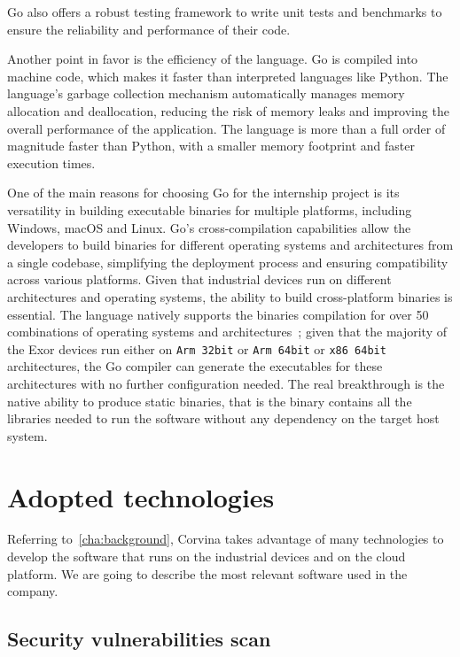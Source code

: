 Go also offers a robust testing framework to write unit tests and benchmarks to ensure the reliability and performance of their code.

Another point in favor is the efficiency of the language. Go is compiled into machine code, which makes it faster than interpreted languages like Python. The language's garbage collection mechanism automatically manages memory allocation and deallocation, reducing the risk of memory leaks and improving the overall performance of the application. The language is more than a full order of magnitude faster than Python, with a smaller memory footprint and faster execution times.~\cite{go-lang-performance}

One of the main reasons for choosing Go for the internship project is its versatility in building executable binaries for multiple platforms, including Windows, macOS and Linux. Go's cross-compilation capabilities allow the developers to build binaries for different operating systems and architectures from a single codebase, simplifying the deployment process and ensuring compatibility across various platforms. Given that industrial devices run on different architectures and operating systems, the ability to build cross-platform binaries is essential. The language natively supports the binaries compilation for over 50 combinations of operating systems and architectures~\cite{go-lang-compilation-combo}; given that the majority of the Exor devices run either on \texttt{Arm 32bit} or \texttt{Arm 64bit} or \texttt{x86 64bit} architectures, the Go compiler can generate the executables for these architectures with no further configuration needed. The real breakthrough is the native ability to produce static binaries, that is the binary contains all the libraries needed to run the software without any dependency on the target host system.

\section{Adopted technologies}

Referring to~\cref{cha:background}, Corvina takes advantage of many technologies to develop the software that runs on the industrial devices and on the cloud platform. We are going to describe the most relevant software used in the company.

\subsection{Security vulnerabilities scan}

